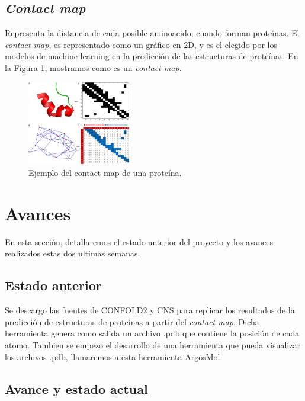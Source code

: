 \documentclass{article}
\begin{document}
	
	\subsection{\textit{Contact map}}
	
	Representa la distancia de cada posible aminoacido, cuando forman proteínas. El \textit{contact map}, es representado como un gráfico en 2D, y es el elegido por los modelos de machine learning en la predicción de las estructuras de proteínas. En la Figura \ref{fig:contact_map}, mostramos como es un \textit{contact map}.
	
	\begin{figure}
		\centering
		\includegraphics[width=0.4\textwidth]{img/papers/contact_map}
		\caption{Ejemplo del contact map de una proteína.}
		\label{fig:contact_map}
	\end{figure}
	
	\section{Avances}
	En esta sección, detallaremos el estado anterior del proyecto y los avances realizados estas dos ultimas semanas.
	
	\subsection{Estado anterior}
	
	Se descargo las fuentes de CONFOLD2 \cite{adhikari2018confold2} y CNS para replicar los resultados de la predicción de estructuras de proteinas a partir del \textit{contact map}. Dicha herramienta genera como salida un archivo .pdb que contiene la posición de cada atomo. Tambien se empezo el desarrollo de una herramienta que pueda visualizar los archivos .pdb, llamaremos a esta herramienta ArgosMol.
		
	\subsection{Avance y estado actual}
	
\end{document}
